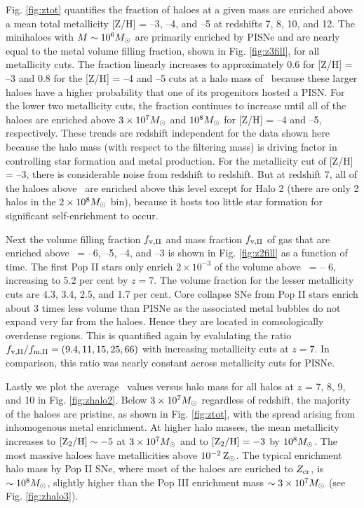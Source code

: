 \documentclass[useAMS,usenatbib]{mn2e}
\begin{document}
Fig. \ref{fig:ztot} quantifies the fraction of haloes at a given mass
are enriched above a mean total metallicity [Z/H] = --3, --4, and --5
at redshifts 7, 8, 10, and 12.  The minihaloes with $M \sim 10^6 \Ms$
are primarily enriched by PISNe and are nearly equal to the metal
volume filling fraction, shown in Fig. \ref{fig:z3fill}, for all
metallicity cuts.  The fraction linearly increases to approximately
0.6 for [Z/H] = --3 and 0.8 for the [Z/H] = --4 and --5 cuts at a halo
mass of \Ms~because these larger haloes have a higher
probability that one of its progenitors hosted a PISN.  For the lower
two metallicity cuts, the fraction continues to increase until all of
the haloes are enriched above $3 \times 10^7 \Ms$ and $10^8 \Ms$ for
[Z/H] = --4 and --5, respectively.  These trends are redshift
independent for the data shown here because the halo mass (with
respect to the filtering mass) is driving factor in controlling star
formation and metal production.  For the metallicity cut of [Z/H] =
--3, there is considerable noise from redshift to redshift.  But at
redshift 7, all of the haloes above \Ms~are enriched above
this level except for Halo 2 (there are only 2 halos in the $2 \times
10^8 \Ms$ bin), because it hosts too little star formation for
significant self-enrichment to occur.

Next the volume filling fraction $f_{\rm v,II}$ and mass fraction
$f_{\rm v,II}$ of gas that are enriched above \ztwo~= --6, --5, --4,
and --3 is shown in Fig. \ref{fig:z2fill} as a function of time.  The
first Pop II stars only enrich $2 \times 10^{-3}$ of the volume above
\ztwo~= -- 6, increasing to 5.2 per cent by $z=7$.  The volume
fraction for the lesser metallicity cuts are 4.3, 3.4, 2.5, and 1.7
per cent.  Core collapse SNe from Pop II stars enrich about 3 times
less volume than PISNe as the associated metal bubbles do not expand
very far from the haloes.  Hence they are located in comsologically
overdense regions.  This is quantified again by evalulating the ratio
$f_{\rm v,II}/f_{\rm m,II} = (9.4, 11, 15, 25, 66)$ with increasing
metallicity cuts at $z=7$.  In comparison, this ratio was nearly
constant across metallicity cuts for PISNe.

Lastly we plot the average \ztwo~values versus halo mass for all halos
at $z$ = 7, 8, 9, and 10 in Fig. \ref{fig:zhalo2}.  Below $3 \times
10^7 \Ms$ regardless of redshift, the majority of the haloes are
pristine, as shown in Fig. \ref{fig:ztot}, with the spread arising
from inhomogenous metal enrichment.  At higher halo masses, the mean
metallicity increases to $\ztwo \sim -5$ at $3 \times 10^7 \Ms$ and to
$\ztwo = -3$ by $10^8 \Ms$.  The most massive haloes have
metallicities above $10^{-2} {\rm\,Z_\odot}$.  The typical enrichment halo mass
by Pop II SNe, where most of the haloes are enriched to $Z_{\rm cr}$,
is $\sim 10^8 \Ms$, slightly higher than the Pop III enrichment mass
$\sim 3 \times 10^7 \Ms$ (see Fig. \ref{fig:zhalo3}).
\end{document}
